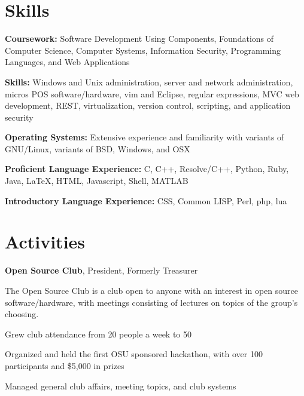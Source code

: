 \documentclass[letterpaper]{resume}
\begin{document}
\section{Skills}

\begin{compactitem}
\item
	\textbf{Coursework:}
	Software Development Using Components, Foundations of Computer Science,
	Computer Systems, Information Security, Programming Languages,
	and Web Applications

\item
	\textbf{Skills:}
	Windows and Unix administration, server and network
	administration, micros POS software/hardware, vim and Eclipse,
	regular expressions, MVC web development, REST, virtualization, version
	control, scripting, and application security

\item
	\textbf{Operating Systems:}
	Extensive experience and familiarity with variants of GNU/Linux, variants
	of BSD, Windows, and OSX

\item
	\textbf{Proficient Language Experience:}
	C, C++, Resolve/C++, Python, Ruby, Java, \LaTeX, HTML, Javascript, Shell,
	MATLAB
\item
	\textbf{Introductory Language Experience:}
	CSS, Common LISP, Perl, php, lua

\end{compactitem}

\section{Activities}

\textbf{Open Source Club}, President, Formerly Treasurer
\begin{compactitem}
\item The Open Source Club is a club open to anyone with an
	interest in open source software/hardware, with meetings consisting of
	lectures on topics of the group's choosing.
\item Grew club attendance from 20 people a week to 50
\item Organized and held the first OSU sponsored hackathon, with over 100 participants and \$5,000 in prizes
\item Managed general club affairs, meeting topics, and club systems
\end{compactitem}
\end{document}
